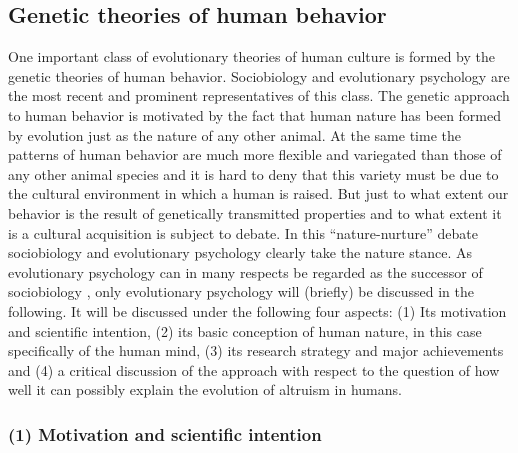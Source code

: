 \subsection{Genetic theories of human behavior}
\label{geneticEvolution}
One important class of evolutionary theories of human culture is formed by the
genetic theories of human behavior. Sociobiology and evolutionary psychology
are the most recent and prominent representatives of this class. The genetic
approach to human behavior is motivated by the fact that human nature has
been formed by evolution just as the nature of any other animal. At the same
time the patterns of human behavior are much more flexible and variegated
than those of any other animal species and it is hard to deny that this
variety must be due to the cultural environment in which a human is raised. But
just to what extent our behavior is the result of genetically transmitted
properties and to what extent it is a cultural acquisition is subject to
debate. In this ``nature-nurture'' debate sociobiology and evolutionary
psychology clearly take the nature stance. As evolutionary psychology can in
many respects be regarded as the successor of sociobiology \cite[p.\ 
21]{dupre:2001}, only evolutionary psychology will (briefly) be discussed in
the following. It will be discussed under the following four aspects: (1) Its
motivation and scientific intention, (2) its basic conception of human nature,
in this case specifically of the human mind, (3) its research strategy and
major achievements and (4) a critical discussion of the approach with respect
to the question of how well it can possibly explain the evolution of altruism
in humans.

\subsubsection{(1) Motivation and scientific intention} 

